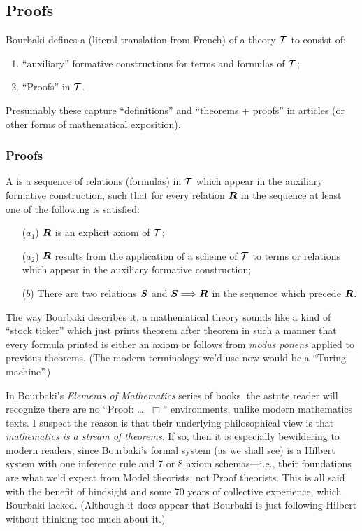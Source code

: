 \subsection{Proofs}

\begin{definition}
Bourbaki defines a  (literal translation from
French) of a theory $\mathcal{T}$ to consist of:
\begin{enumerate}
\item ``auxiliary'' formative constructions for terms and formulas of
  $\mathcal{T}$; 
\item ``Proofs'' in $\mathcal{T}$.
\end{enumerate}
Presumably these capture ``definitions'' and ``theorems + proofs''
in articles (or other forms of mathematical exposition).
\end{definition}

\subsubsection{Proofs}\label{subsec:2-2:proofs} A  is a sequence of
relations (formulas) in $\mathcal{T}$ which appear in the auxiliary
formative construction, such that for every relation $\boldsymbol{R}$
in the sequence at least one of the following is satisfied:
\begin{itemize}
\item[($a_{1}$)] $\boldsymbol{R}$ is an explicit axiom of $\mathcal{T}$;
\item[($a_{2}$)] $\boldsymbol{R}$ results from the application of a
  scheme of $\mathcal{T}$ to terms or relations which appear in the
  auxiliary formative construction;
\item[($b$)] There are two relations $\boldsymbol{S}$ and
  $\boldsymbol{S}\Longrightarrow\boldsymbol{R}$ in the sequence which
  precede $\boldsymbol{R}$. 
\end{itemize}
The way Bourbaki describes it, a mathematical theory sounds like a kind
of ``stock ticker'' which just prints theorem after theorem in such a
manner that every formula printed is either an axiom or follows from
\textit{modus ponens} applied to previous theorems. (The modern
terminology we'd use now would be a ``Turing machine''.)

\begin{remark}
In Bourbaki's \textit{Elements of Mathematics} series of books, the
astute reader will recognize there are no ``Proof: \dots. $\Box$''
environments, unlike modern mathematics texts. I suspect the reason is
that their underlying philosophical view is that
\emph{mathematics is a stream of theorems}. If so, then it is especially
bewildering to modern readers, since Bourbaki's formal system (as we
shall see) is a Hilbert system with one inference rule and 7 or 8 axiom
schemas---i.e., their foundations are what we'd expect from Model
theorists, not Proof theorists. This is all said with the benefit of
hindsight and some 70 years of collective experience, which Bourbaki
lacked. (Although it does appear that Bourbaki is just following Hilbert without
thinking too much about it.)
\end{remark}

